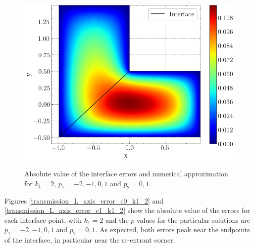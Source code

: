 \begin{figure}[!htb]
    \begin{minipage}{.6\textwidth}
      \centering
      \includegraphics[width=\linewidth]{Images/Transmission/L_shape_2_axis_sol_k1_2_enr.png}
      \label{transmission_L_axis_plot_k1_2}
    \end{minipage}
    
    \caption{Absolute value of the interface errors and numerical approximation for \(k_1=2\), \(p_1=-2, -1, 0, 1\) and \(p_2 = 0, 1\).}
    \label{}
\end{figure}

Figures \ref{transmission_L_axis_error_c0_k1_2} and \ref{transmission_L_axis_error_c1_k1_2} show the absolute value of the errors for each interface point, with \(k_1=2\) and the \(p\) values for the particular solutions are \(p_1=-2, -1, 0, 1\) and \(p_2 = 0, 1\). As expected, both errors peak near the endpoints of the interface, in particular near the re-entrant corner.